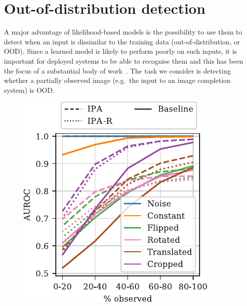 \section{Out-of-distribution detection} \label{supp:cigcvae-ood} A major advantage of
likelihood-based models is the possibility to use them to detect when an input
is dissimilar to the training data (out-of-distribution, or OOD). Since a
learned model is likely to perform poorly on such inputs, it is important for
deployed systems to be able to recognise them and this has been the focus of a
substantial body of
work~\citep{ren2019likelihood,hendrycks2016baseline,xiao2020likelihood,havtorn2021hierarchical}.
The task we consider is detecting whether a partially observed image (e.g.~the
input to an image completion system) is OOD.


\begin{figure}[t]
    \footnotesize
  \centering
  \begin{minipage}{0.41\textwidth}

    \centering
    \includegraphics[scale=.8]{figs/cigcvae/ood-ffhq}

  \end{minipage}
  \begin{minipage}{.58\textwidth}


\end{minipage}
\end{figure}
